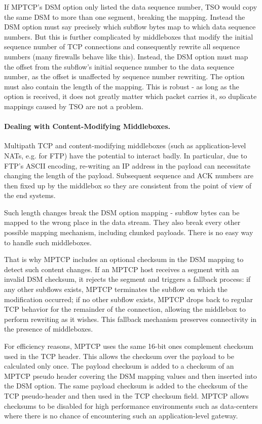 If MPTCP's DSM option only listed the data sequence number, TSO would
copy the same DSM to more than one segment, breaking the mapping.
Instead the DSM option must say precisely which subflow bytes map to
which data sequence numbers.  But this is further complicated by
middleboxes that modify the initial sequence number of TCP connections
and consequently rewrite all sequence numbers (many firewalls behave like this).
Instead, the {\sc DSM} option must map the offset from the
subflow's initial sequence number to the data sequence number, as the
offset is unaffected by sequence number rewriting.  The option must
also contain the length of the mapping.  This is robust - as long as
the option is received, it does not greatly matter which packet
carries it, so duplicate mappings caused by TSO are not a
problem.

\paragraph{Dealing with Content-Modifying Middleboxes.}
Multipath TCP and content-modifying middleboxes (such as application-level NATs, e.g. for FTP)
have the potential to interact badly.  In particular, due to FTP's ASCII
encoding, re-writing an IP address in the payload can necessitate
changing the length of the payload.  Subsequent sequence and ACK
numbers are then fixed up by the middlebox so they are consistent from
the point of view of the end systems.

Such length changes break the DSM option mapping - subflow bytes can
be mapped to the wrong place in the data stream.  They also
break every other possible mapping mechanism, including chunked
payloads.  There is no easy way to handle such middleboxes.

That is why MPTCP includes an optional checksum in
the DSM mapping to detect such content changes. If an MPTCP host
receives a segment with an invalid DSM checksum, it
rejects the segment and triggers a fallback process:  if any
other subflows exists, MPTCP terminates the subflow on which the
modification occurred;  if no other subflow exists, MPTCP drops back to
regular TCP behavior for the remainder of the connection, allowing the
middlebox to perform rewriting as it wishes. This fallback mechanism
preserves connectivity in the presence of middleboxes.

For efficiency reasons, MPTCP uses the same 16-bit ones complement checksum
used in the TCP header.  This allows the checksum over the payload to
be calculated only once.  The payload checksum is added to a checksum
of an MPTCP pseudo header covering the DSM mapping values and then
inserted into the DSM option.   The same payload checksum is added to the
checksum of the TCP pseudo-header and then used in the TCP checksum field.
MPTCP allows checksums to be disabled for high performance environments such as data-centers where
there is no chance of encountering such an application-level gateway.

